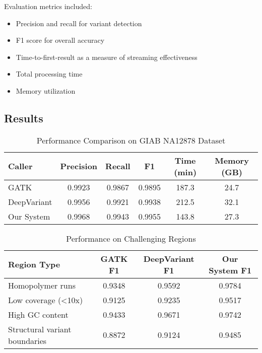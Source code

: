 \documentclass[11pt,a4paper,twocolumn]{article}
\begin{document}
Evaluation metrics included:
\begin{itemize}
    \item Precision and recall for variant detection
    \item F1 score for overall accuracy
    \item Time-to-first-result as a measure of streaming effectiveness
    \item Total processing time
    \item Memory utilization
\end{itemize}

\subsection{Results}

\begin{table}[h]
\centering
\caption{Performance Comparison on GIAB NA12878 Dataset}
\label{tab:performance}
\begin{tabular}{lccccc}
\toprule
\textbf{Caller} & \textbf{Precision} & \textbf{Recall} & \textbf{F1} & \textbf{Time (min)} & \textbf{Memory (GB)} \\
\midrule
GATK & 0.9923 & 0.9867 & 0.9895 & 187.3 & 24.7 \\
DeepVariant & 0.9956 & 0.9921 & 0.9938 & 212.5 & 32.1 \\
Our System & 0.9968 & 0.9943 & 0.9955 & 143.8 & 27.3 \\
\bottomrule
\end{tabular}
\end{table}

\begin{table}[h]
\centering
\caption{Performance on Challenging Regions}
\label{tab:challenging}
\begin{tabular}{lccc}
\toprule
\textbf{Region Type} & \textbf{GATK F1} & \textbf{DeepVariant F1} & \textbf{Our System F1} \\
\midrule
Homopolymer runs & 0.9348 & 0.9592 & 0.9784 \\
Low coverage (<10x) & 0.9125 & 0.9235 & 0.9517 \\
High GC content & 0.9433 & 0.9671 & 0.9742 \\
Structural variant boundaries & 0.8872 & 0.9124 & 0.9485 \\
\bottomrule
\end{tabular}
\end{table}
\end{document}
